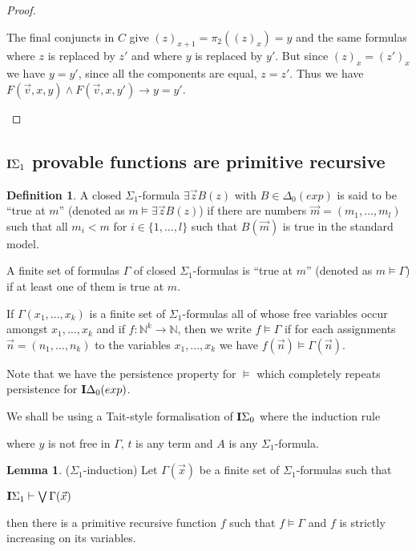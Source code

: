 \documentclass[8pt]{article}
\theoremstyle{definition}
\newtheorem{definition}{Definition}[section]
\theoremstyle{definition}
\theoremstyle{definition}
\theoremstyle{definition}
\theoremstyle{definition}
\theoremstyle{definition}
\theoremstyle{definition}
\theoremstyle{definition}
\newtheorem{lemma}{Lemma}[section]
\theoremstyle{definition}
\theoremstyle{definition}
\theoremstyle{definition}
\theoremstyle{definition}
\theoremstyle{definition}
\theoremstyle{question}
\begin{document}
\begin{proof}
\begin{enumerate}
\begin{enumerate}
    The final conjuncts in $C$ give $(z)_{x + 1} = \pi_2((z)_x) = y$ and the same formulas where $z$ is replaced by $z'$ 
    and where $y$ is replaced by $y'$. But since $(z)_x = (z')_x$ we have $y = y'$, since all the components are equal,
    $z = z'$. Thus we have $F(\vec{v}, x, y) \land F(\vec{v}, x, y') \to y = y'$.
  \end{enumerate}
  \end{enumerate}
\end{proof}

\subsection{${\bf I}\Sigma_1$ provable functions are primitive recursive}

\begin{definition}
  A closed $\Sigma_1$-formula $\exists \vec{z} B(z)$ with $B \in \Delta_0(exp)$ is said to be
  ``true at $m$'' (denoted as $m \models \exists \vec{z} B(z)$) if there are numbers
  $\vec{m} = (m_1, \dots, m_l)$ such that all $m_i < m$ for $i \in \{1, \dots, l\}$
  such that $B(\vec{m})$ is true in the standard model.
  
  A finite set of formulas $\Gamma$ of closed $\Sigma_1$-formulas is ``true at $m$'' 
  (denoted as $m \models \Gamma$) if at least one of them is true at $m$.

  If $\Gamma(x_1, \dots, x_k)$ is a finite set of $\Sigma_1$-formulas all of whose
  free variables occur amongst $x_1, \dots, x_k$ and if $f : \mathbb{N}^k \to \mathbb{N}$, then we write 
  $f \models \Gamma$ if for each assignments $\vec{n} = (n_1, \dots, n_k)$ to the variables  $x_1, \dots, x_k$
  we have $f(\vec{n}) \models \Gamma(\vec{n})$.
\end{definition}

Note that we have the persistence property for $\models$ 
which completely repeats persistence for ${\bf I}\Delta_0(exp)$.

We shall be using a Tait-style formalisation of ${\bf I}\Sigma_0$ where the induction rule

\begin{prooftree}
\end{prooftree}

where $y$ is not free in $\Gamma$, $t$ is any term and $A$ is any $\Sigma_1$-formula.

\begin{lemma} ($\Sigma_1$-induction)
  Let $\Gamma(\vec{x})$ be a finite set of $\Sigma_1$-formulas such that
  \begin{center}
    ${\bf I}\Sigma_1 \vdash \bigvee \Gamma(\vec{x})$
  \end{center}
  then there is a primitive recursive function $f$ such that $f \models \Gamma$ and $f$ is strictly increasing
  on its variables.
\end{lemma}
\end{document}
